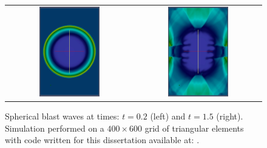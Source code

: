 \begin{figure}[htbp]\figSpace 
\begin{tabular}{cc}
\includegraphics[width=0.5\textwidth]{fig/bw0020.jpg} & 
\includegraphics[width=0.5\textwidth]{fig/bw0175.jpg} 
\end{tabular}
\caption{Spherical blast waves at times: $t=0.2$ (left) and $t=1.5$ (right).  Simulation performed on a $400 \times 600$ grid of triangular elements with code written for this dissertation available at: \protect\gitrepo.}
\label{fig:blast_waves}
\figSpace
\end{figure}

